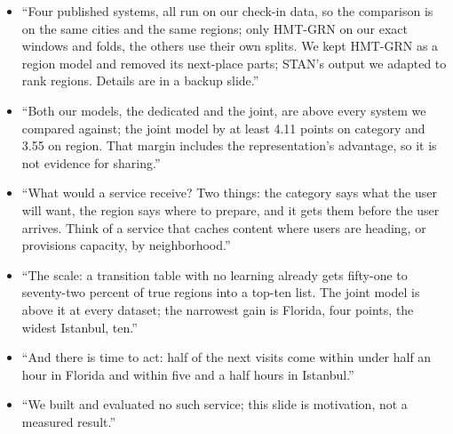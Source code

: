 \say
\begin{itemize}
  \item ``Four published systems, all run on our check-in data, so the comparison is on the same
        cities and the same regions; only HMT-GRN on our exact windows and folds, the others use their
        own splits. We kept HMT-GRN as a region model and removed its next-place parts; STAN's output we
        adapted to rank regions. Details are in a backup slide.''
  \item ``Both our models, the dedicated and the joint, are above every system we compared against;
        the joint model by at least 4.11 points on category and 3.55 on region. That margin includes the
        representation's advantage, so it is not evidence for sharing.''
\end{itemize}

\say
\begin{itemize}
  \item ``What would a service receive? Two things: the category says what the user will want, the
        region says where to prepare, and it gets them before the user arrives. Think of a service that
        caches content where users are heading, or provisions capacity, by neighborhood.''
  \item ``The scale: a transition table with no learning already gets fifty-one to seventy-two percent
        of true regions into a top-ten list. The joint model is above it at every dataset; the narrowest
        gain is Florida, four points, the widest Istanbul, ten.''
  \item ``And there is time to act: half of the next visits come within under half an hour in Florida
        and within five and a half hours in Istanbul.''
  \item ``We built and evaluated no such service; this slide is motivation, not a measured result.''
\end{itemize}

